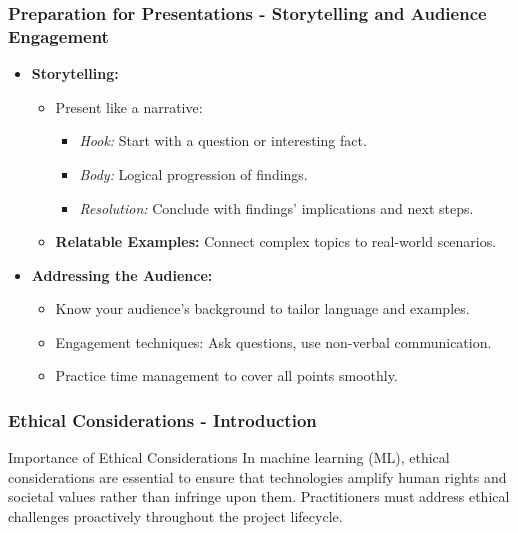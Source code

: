 \documentclass[aspectratio=169]{beamer}
\begin{document}
\begin{frame}[fragile]
    \frametitle{Preparation for Presentations - Storytelling and Audience Engagement}
    \begin{itemize}
        \item \textbf{Storytelling:}
            \begin{itemize}
                \item Present like a narrative: 
                \begin{itemize}
                    \item \textit{Hook:} Start with a question or interesting fact.
                    \item \textit{Body:} Logical progression of findings.
                    \item \textit{Resolution:} Conclude with findings' implications and next steps.
                \end{itemize}
                \item \textbf{Relatable Examples:} Connect complex topics to real-world scenarios.
            \end{itemize}
        \item \textbf{Addressing the Audience:}
            \begin{itemize}
                \item Know your audience's background to tailor language and examples.
                \item Engagement techniques: Ask questions, use non-verbal communication.
                \item Practice time management to cover all points smoothly.
            \end{itemize}
    \end{itemize}
\end{frame}

\begin{frame}[fragile]
    \frametitle{Ethical Considerations - Introduction}
    \begin{block}{Importance of Ethical Considerations}
        In machine learning (ML), ethical considerations are essential to ensure that technologies amplify human rights and societal values rather than infringe upon them. Practitioners must address ethical challenges proactively throughout the project lifecycle.
    \end{block}
\end{frame}
\end{document}
